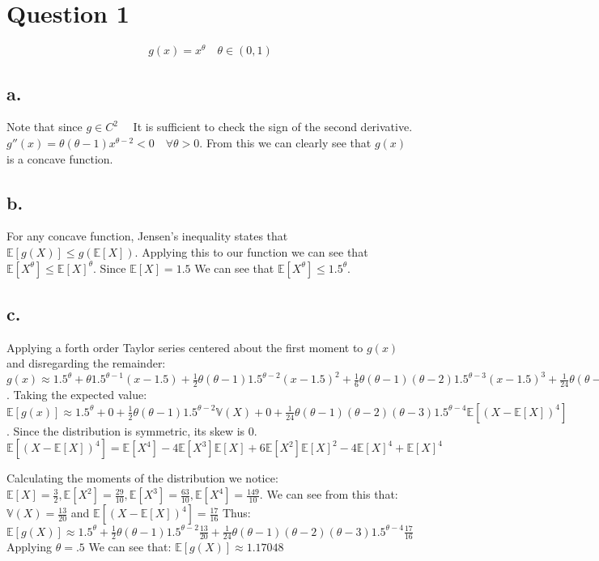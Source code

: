 \documentclass{paper}
\begin{document}
\section*{Question 1}
$$g(x) = x^\theta  \quad  \theta \in (0,1)$$
\subsection*{a.}
Note that since $g \in C^2\quad $ It is sufficient to check the sign of the second derivative. $g''(x) = \theta ( \theta - 1 ) x^{\theta - 2} < 0 \quad \forall \theta > 0$. From this we can clearly see that $g(x)$ is a concave function.

\subsection*{b.}
For any concave function, Jensen's inequality states that $\mathbb{E}[g(X)] \leq g( \mathbb{E}[X] )$. Applying this to our function we can see that $\mathbb{E}[ X^\theta ] \leq \mathbb{E}[X]^\theta$. Since $\mathbb{E}[X] = 1.5$ We can see that $\mathbb{E}[ X^\theta ] \leq 1.5^\theta$.

\subsection*{c.}
Applying a forth order Taylor series centered about the first moment to $g(x)$ and disregarding the remainder:
\newline
$g(x) \approx 1.5^\theta + \theta 1.5^{\theta - 1} ( x - 1.5 ) + \frac{1}{2} \theta ( \theta - 1 ) 1.5^{\theta - 2} ( x- 1.5)^2 + \frac{1}{6} \theta ( \theta - 1 ) ( \theta - 2) 1.5^{\theta - 3} (x - 1.5)^3 + \frac{1}{24} \theta ( \theta - 1 ) ( \theta - 2) (\theta - 3) 1.5^{\theta -4}(x-1.5)^4$.
\newline
Taking the expected value: $\mathbb{E}[g(x)] \approx 1.5^\theta  + 0 + \frac{1}{2} \theta ( \theta - 1 ) 1.5^{\theta -2} \mathbb{V}(X) + 0 + \frac{1}{24} \theta ( \theta - 1 ) ( \theta - 2 ) (\theta - 3) 1.5^{\theta - 4} \mathbb{E}[ (X - \mathbb{E}[X])^4 ]$.
\newline
Since the distribution is symmetric, its skew is 0. 
\newline
$\mathbb{E}[ (X - \mathbb{E}[X])^4 ] = \mathbb{E}[X^4] - 4\mathbb{E}[X^3]\mathbb{E}[X] + 6\mathbb{E}[X^2]\mathbb{E}[X]^2 - 4 \mathbb{E}[X]^4 + \mathbb{E}[X]^4$

Calculating the moments of the distribution we notice: $\mathbb{E}[X]= \frac{3}{2}, \mathbb{E}[X^2] = \frac{29}{10}, \mathbb{E}[X^3] = \frac{63}{10},\mathbb{E}[X^4] = \frac{149}{10}$. We can see from this that:
$\mathbb{V}(X) = \frac{13}{20}$ and $\mathbb{E}[( X-\mathbb{E}[X])^4] = \frac{17}{16}$
\newline
Thus: $\mathbb{E}[g(X)] \approx 1.5^\theta + \frac{1}{2} \theta ( \theta - 1 ) 1.5^{\theta -2} \frac{ 13 }{20} + \frac{1}{24} \theta ( \theta - 1 ) ( \theta - 2 ) (\theta - 3) 1.5^{\theta - 4} \frac{17}{16}$
Applying $\theta = .5$ We can see that: $\mathbb{E}[g(X)] \approx 1.17048$
\end{document}
